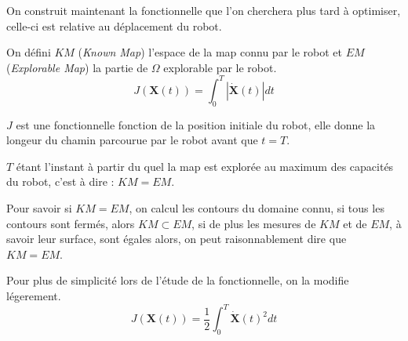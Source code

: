 \documentclass[main.tex]{subfiles}
\begin{document}
On construit maintenant la fonctionnelle que l'on cherchera plus tard à optimiser, celle-ci est relative au déplacement du robot.


On défini $\mathit{KM}$ (\textit{Known Map}) l'espace de la map connu par le robot et $\mathit{EM}$ (\textit{Explorable Map}) la partie de $\Omega$ explorable par le robot.
\begin{equation}
    \displaystyle
    J(\mathbf{X}(t)) = \int_{0}^{T} | \mathbf{\dot{X}}(t) | dt
\end{equation}

$J$ est une fonctionnelle fonction de la position initiale du robot, elle donne la longeur du chamin parcourue par le robot avant que $t = T$.

$T$ étant l'instant à partir du quel la map est explorée au maximum des capacités du robot, c'est à dire : $KM = EM$.

Pour savoir si $KM = EM$, on calcul les contours du domaine connu, si tous les contours sont fermés, alors $KM \subset EM$, si de plus les mesures de $KM$ et de $EM$, à savoir leur surface, sont égales alors, on peut raisonnablement dire que $KM = EM$.


Pour plus de simplicité lors de l'étude de la fonctionnelle, on la modifie légerement.
\begin{equation}
    \displaystyle
    J(\mathbf{X}(t)) = \frac{1}{2} \int_{0}^{T} \mathbf{\dot{X}}(t)^{2} dt
\end{equation}
\end{document}
